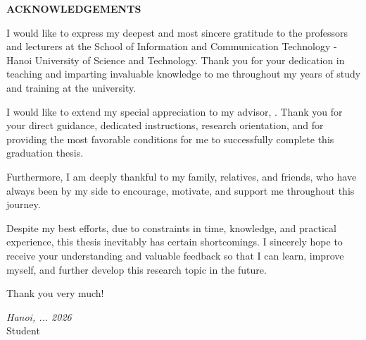 \documentclass[../main.tex]{subfiles}
\begin{document}
\begin{center}
    \textbf{\huge ACKNOWLEDGEMENTS}
\end{center}
\vspace{0.5cm}

I would like to express my deepest and most sincere gratitude to the professors and lecturers at the School of Information and Communication Technology - Hanoi University of Science and Technology. Thank you for your dedication in teaching and imparting invaluable knowledge to me throughout my years of study and training at the university.

I would like to extend my special appreciation to my advisor, \textbf{\INSTRUCTOR}. Thank you for your direct guidance, dedicated instructions, research orientation, and for providing the most favorable conditions for me to successfully complete this graduation thesis.

Furthermore, I am deeply thankful to my family, relatives, and friends, who have always been by my side to encourage, motivate, and support me throughout this journey.

Despite my best efforts, due to constraints in time, knowledge, and practical experience, this thesis inevitably has certain shortcomings. I sincerely hope to receive your understanding and valuable feedback so that I can learn, improve myself, and further develop this research topic in the future.

Thank you very much!

\begin{flushright}
    \textit{Hanoi, ... 2026} \\
    Student \\
    \vspace{2cm}
    \textbf{\AUTHOR}
\end{flushright}
\end{document}
